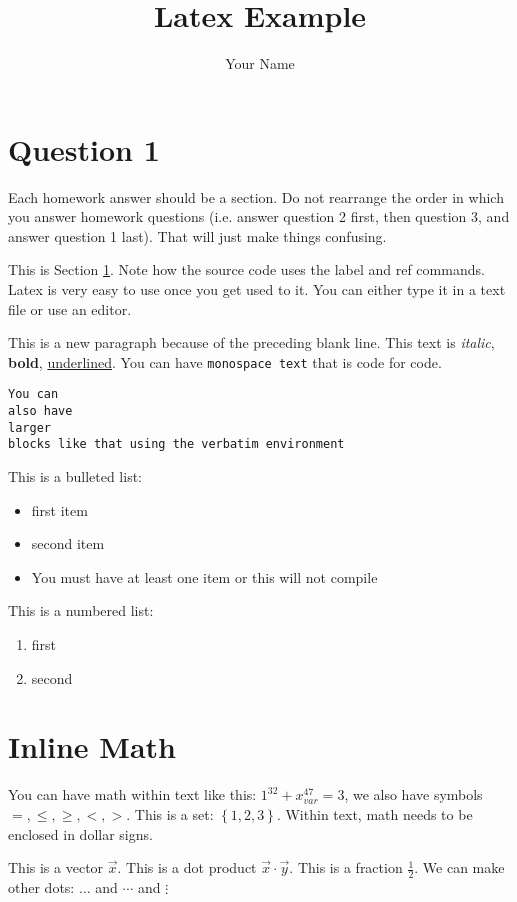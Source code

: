 \documentclass{amsart}
\newcommand{\set}[1]{\ensuremath{\left\{#1\right\}}}
\begin{document}
\title{Latex Example}
\author{Your Name}
\maketitle


\section{Question 1}\label{sec:q1}
Each homework answer should be a section. Do not rearrange the order in which you answer homework questions (i.e. answer question 2 first, then question 3, and answer question 1 last). That will just make things confusing.

This is Section \ref{sec:q1}. Note how the source code uses the label and ref commands. Latex is very easy to use once you get used to it. You can either type it in a text file or use an editor.

This is a new paragraph because of the preceding blank line. This text is \textit{italic}, \textbf{bold}, \underline{underlined}. You can have \texttt{monospace text} that is code for code. 
\begin{verbatim}
You can
also have
larger
blocks like that using the verbatim environment
\end{verbatim}

This is a bulleted list:
\begin{itemize}
\item first item
\item second item
\item You must have at least one item or this will not compile
\end{itemize}

This is a numbered list:
\begin{enumerate}
\item first
\item second
\end{enumerate}

\section{Inline Math}\label{sec:inline}
You can have math within text like this: $1^{32}+x_{var}^47 = 3$, we also have symbols $=, \leq, \geq, <, >$. This is a set: $\set{1,2,3}$. Within text, math needs to be enclosed in dollar signs.


This is a vector $\vec{x}$. This is a dot product $\vec{x}\cdot\vec{y}$. This is a fraction $\frac{1}{2}$. We can make other dots: $\dots$ and $\cdots$ and $\vdots$
\end{document}

